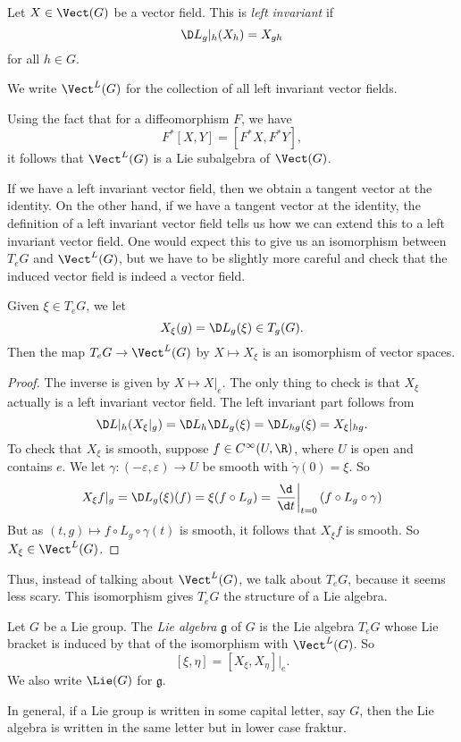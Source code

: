 \documentclass[a4paper]{article}
\begin{document}
\begin{defi}
  Let $X \in \Vect(G)$ be a vector field. This is \emph{left invariant} if
  \[
    \D L_g|_h (X_h) = X_{gh}
  \]
  for all $h \in G$.

  We write $\Vect^L(G)$ for the collection of all left invariant vector fields.
\end{defi}

Using the fact that for a diffeomorphism $F$, we have
\[
  F^*[X, Y] = [F^* X, F^* Y],
\]
it follows that $\Vect^L(G)$ is a Lie subalgebra of $\Vect(G)$.

If we have a left invariant vector field, then we obtain a tangent vector at the identity. On the other hand, if we have a tangent vector at the identity, the definition of a left invariant vector field tells us how we can extend this to a left invariant vector field. One would expect this to give us an isomorphism between $T_e G$ and $\Vect^L(G)$, but we have to be slightly more careful and check that the induced vector field is indeed a vector field.

\begin{lemma}
  Given $\xi \in T_e G$, we let
  \[
    X_\xi(g) = \D L_g(\xi) \in T_g(G).
  \]
  Then the map $T_e G \to \Vect^L(G)$ by $X \mapsto X_\xi$ is an isomorphism of vector spaces.
\end{lemma}

\begin{proof}
  The inverse is given by $X \mapsto X|_e$. The only thing to check is that $X_\xi$ actually is a left invariant vector field. The left invariant part follows from
  \[
    \D L|_h (X_\xi|_g) = \D L_h \D L_g (\xi) = \D L_{hg}(\xi) = X_\xi |_{hg}.
  \]
  To check that $X_\xi$ is smooth, suppose $f \in C^\infty(U, \R)$, where $U$ is open and contains $e$. We let $\gamma: (-\varepsilon, \varepsilon) \to U$ be smooth with $\dot{\gamma}(0) = \xi$. So
  \[
    X_\xi f|_g = \D L_g (\xi)(f) = \xi(f \circ L_g) = \left.\frac{\d}{\d t}\right|_{t = 0} (f \circ L_g \circ \gamma)
  \]
  But as $(t, g) \mapsto f \circ L_g \circ \gamma(t)$ is smooth, it follows that $X_\xi f$ is smooth. So $X_\xi \in \Vect^L(G)$.
\end{proof}

Thus, instead of talking about $\Vect^L(G)$, we talk about $T_e G$, because it seems less scary. This isomorphism gives $T_eG$ the structure of a Lie algebra.

\begin{defi}
  Let $G$ be a Lie group. The \emph{Lie algebra} $\mathfrak{g}$ of $G$ is the Lie algebra $T_eG$ whose Lie bracket is induced by that of the isomorphism with $\Vect^L(G)$. So
  \[
    [\xi, \eta] = [X_\xi, X_\eta]|_e.
  \]
  We also write $\Lie(G)$ for $\mathfrak{g}$.
\end{defi}
In general, if a Lie group is written in some capital letter, say $G$, then the Lie algebra is written in the same letter but in lower case fraktur.
\end{document}
